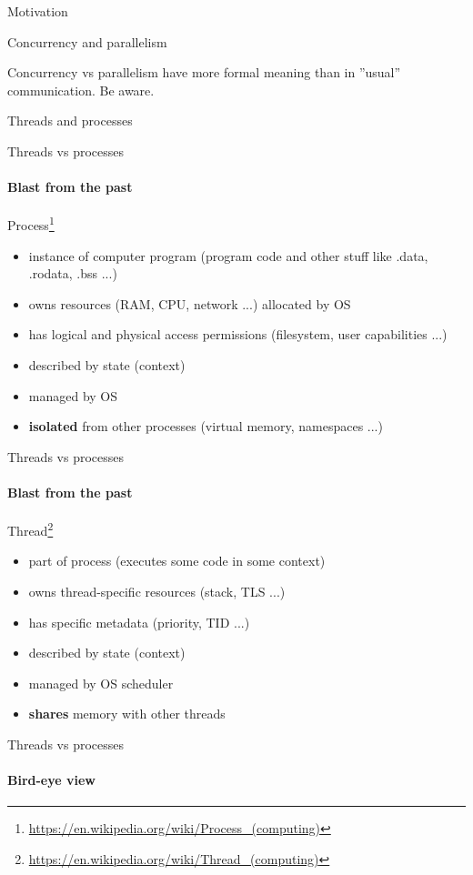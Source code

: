 \begin{section}{Motivation}
\begin{section}{Concurrency and parallelism}
\begin{frame}{Concurrency vs parallelism}
have more formal meaning than in ''usual'' communication. Be aware.

\end{frame}

\begin{section}{Threads and processes}
\showTOC


\begin{frame}{Threads vs processes}
\framesubtitle{Blast from the past}

Process\footnote{\tiny\url{https://en.wikipedia.org/wiki/Process_(computing)}}
\begin{itemize}
    \item instance of computer program (program code and other stuff like .data, .rodata, .bss ...)
    \item owns resources (RAM, CPU, network ...) allocated by OS
    \item has logical and physical access permissions (filesystem, user capabilities ...)
    \item described by state (context)    
    \item managed by OS
    \item \textbf{isolated} from other processes (virtual memory, namespaces ...)
\end{itemize}
\end{frame}

\begin{frame}[noframenumbering]{Threads vs processes}
\framesubtitle{Blast from the past}


Thread\footnote{\tiny\url{https://en.wikipedia.org/wiki/Thread_(computing)}}
\begin{itemize}
    \item part of process (executes some code in some context)
    \item owns thread-specific resources (stack, TLS ...)
    \item has specific metadata (priority, TID ...)
    \item described by state (context)
    \item managed by OS scheduler   
    \item \textbf{shares} memory with other threads
\end{itemize}
\end{frame}


\begin{frame}[t]{Threads vs processes}
\framesubtitle{Bird-eye view}


\end{frame}
\end{section}
\end{section}
\end{section}
